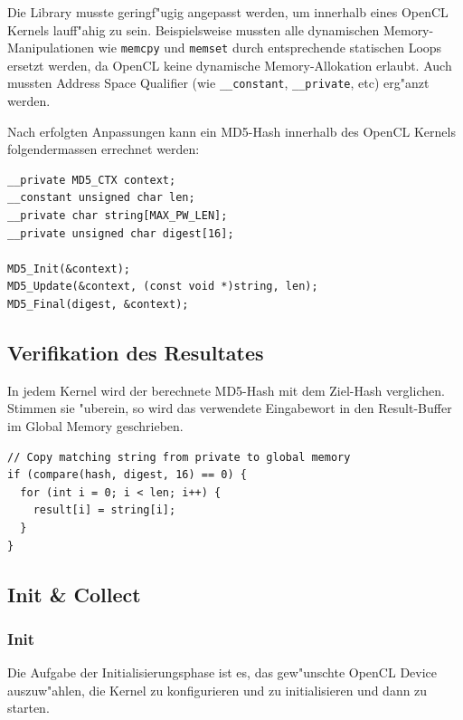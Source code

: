 \begin{refsection}
Die Library musste geringf"ugig angepasst werden, um innerhalb eines OpenCL
Kernels lauff"ahig zu sein. Beispielsweise mussten alle dynamischen
Memory-Manipulationen wie \texttt{memcpy} und \texttt{memset} durch
entsprechende statischen Loops ersetzt werden, da OpenCL keine dynamische
Memory-Al\-lo\-ka\-ti\-on erlaubt. Auch mussten Address Space Qualifier (wie
\texttt{\_\_constant}, \texttt{\_\_private}, etc) erg"anzt werden.

Nach erfolgten Anpassungen kann ein MD5-Hash innerhalb des OpenCL Kernels
folgendermassen errechnet werden:

\begin{small}
\begin{verbatim}
__private MD5_CTX context;
__constant unsigned char len;
__private char string[MAX_PW_LEN];
__private unsigned char digest[16];

MD5_Init(&context);
MD5_Update(&context, (const void *)string, len);
MD5_Final(digest, &context);
\end{verbatim}
\end{small}

\subsection{Verifikation des Resultates}
\label{crypto:verifikation}

In jedem Kernel wird der berechnete MD5-Hash mit dem Ziel-Hash verglichen.
Stimmen sie "uberein, so wird das verwendete Eingabewort in den Result-Buffer im
Global Memory geschrieben.

\begin{small}
\begin{verbatim}
// Copy matching string from private to global memory
if (compare(hash, digest, 16) == 0) {
  for (int i = 0; i < len; i++) {
    result[i] = string[i];
  }
}
\end{verbatim}
\end{small}

\subsection{Init \& Collect}

\subsubsection{Init}

Die Aufgabe der Initialisierungsphase ist es, das gew"unschte OpenCL Device
auszuw"ahlen, die Kernel zu konfigurieren und zu initialisieren und dann zu
starten.


\end{refsection}
